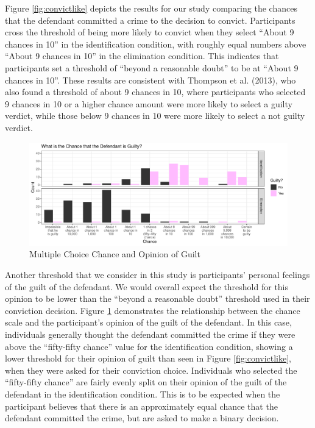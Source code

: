 \documentclass[print]{nuthesis}
\begin{document}
Figure \ref{fig:convictlike} depicts the results for our study comparing the chances that the defendant committed a crime to the decision to convict.
Participants cross the threshold of being more likely to convict when they select ``About 9 chances in 10'' in the identification condition, with roughly equal numbers above ``About 9 chances in 10'' in the elimination condition.
This indicates that participants set a threshold of ``beyond a reasonable doubt'' to be at ``About 9 chances in 10''.
These results are consistent with Thompson et al. (2013), who also found a threshold of about 9 chances in 10, where participants who selected 9 chances in 10 or a higher chance amount were more likely to select a guilty verdict, while those below 9 chances in 10 were more likely to select a not guilty verdict.

\begin{figure}

{\centering \includegraphics[width=\linewidth]{thesis_files/figure-latex/opinionlike-1} 

}

\caption{Multiple Choice Chance and Opinion of Guilt}\label{fig:opinionlike}
\end{figure}

Another threshold that we consider in this study is participants' personal feelings of the guilt of the defendant.
We would overall expect the threshold for this opinion to be lower than the ``beyond a reasonable doubt'' threshold used in their conviction decision.
Figure \ref{fig:opinionlike} demonstrates the relationship between the chance scale and the participant's opinion of the guilt of the defendant.
In this case, individuals generally thought the defendant committed the crime if they were above the ``fifty-fifty chance'' value for the identification condition, showing a lower threshold for their opinion of guilt than seen in Figure \ref{fig:convictlike}, when they were asked for their conviction choice.
Individuals who selected the ``fifty-fifty chance'' are fairly evenly split on their opinion of the guilt of the defendant in the identification condition.
This is to be expected when the participant believes that there is an approximately equal chance that the defendant committed the crime, but are asked to make a binary decision.
\end{document}
